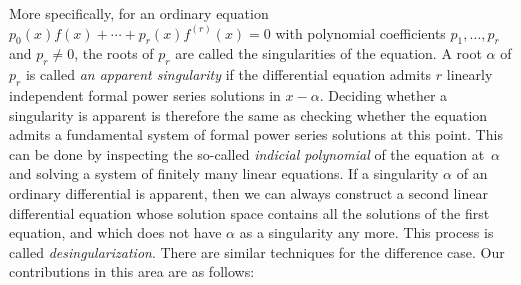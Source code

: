 \documentclass[10pt,a4paper]{article}
\begin{document}
More specifically, for an ordinary equation $p_0(x)f(x) + \cdots + p_r(x)f^{(r)}(x) = 0$ with
polynomial coefficients $p_1,\dots,p_r$ and $p_r\neq0$, the roots of $p_r$ are called the
singularities of the equation. A root $\alpha$ of $p_r$ is called \emph{an apparent singularity} if the
differential equation admits $r$ linearly independent formal power series solutions in 
$x - \alpha$. Deciding whether a singularity is apparent is therefore the same as
checking whether the equation admits a fundamental system of formal power series
solutions at this point. This can be done by inspecting the so-called
\emph{indicial polynomial} of the equation at~$\alpha$ and solving a system of finitely many linear equations. 
If a singularity $\alpha$ of an ordinary differential is apparent, then we can always 
construct a second linear differential equation whose solution space contains all the solutions of the
first equation, and which does not have $\alpha$ as a singularity any more. 
This process is called \emph{desingularization}.  There are similar techniques for the difference case. 
Our contributions in this area are as follows: 
\end{document}
